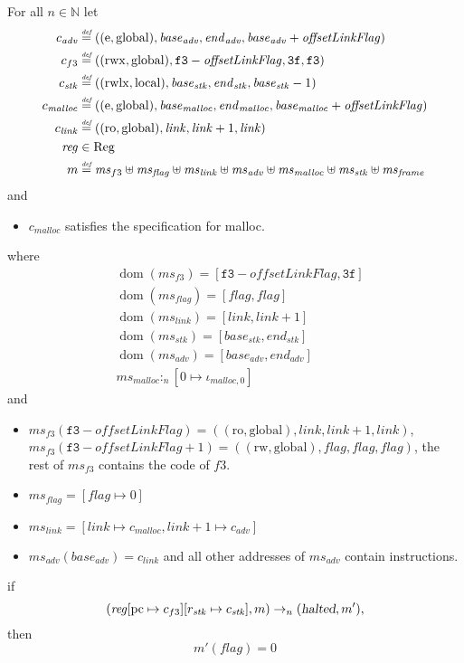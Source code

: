 \documentclass[a4paper]{article}
\newcommand{\update}[2]{[#1 \mapsto #2]}
\newcommand{\defeq}{\stackrel{\textit{\tiny{def}}}{=}}
\DeclareMathOperator{\dom}{dom}
\newcommand{\var}[1]{\mathit{#1}}
\newcommand{\hs}{\var{ms}}
\newcommand{\ms}{\hs}
\newcommand{\pcreg}{\mathrm{pc}}
\newcommand{\start}{\var{base}}
\newcommand{\addrend}{\var{end}}
\newcommand{\reg}{\var{reg}}
\newcommand{\heap}{\var{mem}}
\newcommand{\adv}{\var{adv}}
\newcommand{\link}{\var{link}}
\newcommand{\stk}{\var{stk}}
\newcommand{\flag}{\var{flag}}
\newcommand{\olf}{\var{offsetLinkFlag}}
\newcommand{\halted}{\textsl{halted}}
\newcommand{\heapSat}[3][\heap]{#1 :_{#2} #3}
\newcommand{\codelabel}[1]{\mathit{#1}}
\newcommand{\malloc}{\codelabel{malloc}}
\newcommand{\plaindom}[1]{\mathrm{#1}}
\newcommand{\Regs}{\plaindom{Reg}}
\newcommand{\nats}{\mathbb{N}}
\newcommand{\plainperm}[1]{\mathrm{#1}}
\newcommand{\readonly}{\plainperm{ro}}
\newcommand{\readwrite}{\plainperm{rw}}
\newcommand{\entry}{\plainperm{e}}
\newcommand{\rwx}{\plainperm{rwx}}
\newcommand{\rwlx}{\plainperm{rwlx}}
\newcommand{\local}{\plainperm{local}}
\newcommand{\glob}{\plainperm{global}}
\newcommand{\step}[1][]{\rightarrow_{#1}}
\begin{document}
\begin{lemma}
  \label{lem:correctness-f3}
  For all $n \in \nats$
  let
  \begin{align*}
    c_{\var{adv}} & \defeq ((\entry,\glob),\start_{\adv},\addrend_{\adv},\start_{\adv}+\olf) \\
    c_{f3} & \defeq ((\rwx,\glob),\mathtt{f3}-\olf,\mathtt{3f},\mathtt{f3}) \\
    c_{\var{stk}} & \defeq ((\rwlx,\local),\start_\stk,\addrend_\stk,\start_\stk-1) \\
    c_\malloc & \defeq ((\entry,\glob),\start_\malloc,\addrend_\malloc,\start_\malloc+\olf) \\
    c_\link & \defeq ((\readonly,\glob),\link,\link+1,\link) \\
    \reg & \in \Regs \\
    m & \defeq \hs_{f3} \uplus 
        \hs_\flag \uplus                
        \ms_{\var{link}} \uplus 
        \hs_\adv \uplus 
        \ms_{\malloc} \uplus 
        \ms_{\var{stk}} \uplus
        \ms_{\var{frame}} 
  \end{align*}
  and
  \begin{itemize}
  \item $c_\malloc$ satisfies the specification for malloc.
  \end{itemize}
  where 
  \begin{align*}
    &\dom(\hs_{f3}) = [\mathtt{f3}-\olf,\mathtt{3f}] \\
    &\dom(\hs_\flag) = [\flag,\flag] \\
    &\dom(\ms_\link) = [\link,\link+1]\\
    &\dom(\ms_\stk) = [\start_\stk, \addrend_\stk]\\
    &\dom(\hs_{\adv}) = [\start_\adv,\addrend_\adv] \\
    &\heapSat[\hs_{\malloc}]{n}{[0 \mapsto \iota_{\malloc,0}]}
  \end{align*}
  and
  \begin{itemize}
  \item $\ms_{f3}(\mathtt{f3}-\olf) = ((\readonly,\glob),\link,\link+1,\link)$, $\ms_{f3}(\mathtt{f3}-\olf+1) = ((\readwrite,\glob),\flag,\flag,\flag)$, the rest of $\hs_{f3}$ contains the code of $f3$.
  \item $\ms_\flag = [\flag \mapsto 0]$
  \item $\ms_{\var{link}} = [\var{link} \mapsto c_\malloc, \var{link} + 1 \mapsto c_\adv]$
  \item $\hs_\adv(\start_\adv) = c_\link$ and all other addresses of $\ms_\adv$ contain instructions.
  \end{itemize}
  if 
  \[
    (\reg\update{\pcreg}{c_{f3}}\update{r_\stk}{c_\stk},m) \step[n] (\halted,m'),
  \]
  then
  \[
    m'(\flag) = 0
  \]  
\end{lemma}
\end{document}
